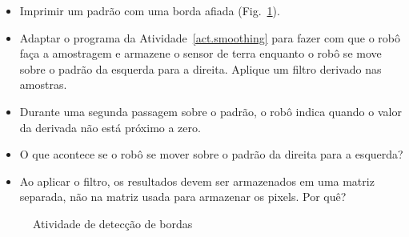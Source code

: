 
\begin{framed}
\begin{itemize}
\item Imprimir um padrão com uma borda afiada (Fig.~\ref{fig.edge-activity}).
\item Adaptar o programa da Atividade~\ref{act.smoothing} para fazer com que o robô faça a amostragem e armazene o sensor de terra enquanto o robô se move sobre o padrão da esquerda para a direita. Aplique um filtro derivado nas amostras.
\item Durante uma segunda passagem sobre o padrão, o robô indica quando o valor da derivada não está próximo a zero.
\item O que acontece se o robô se mover sobre o padrão da direita para a esquerda?
\item Ao aplicar o filtro, os resultados devem ser armazenados em uma matriz separada, não na matriz usada para armazenar os pixels. Por quê?
\end{itemize}
\end{framed}

\begin{figure}
\caption{Atividade de detecção de bordas}\label{fig.edge-activity}
\end{figure}

